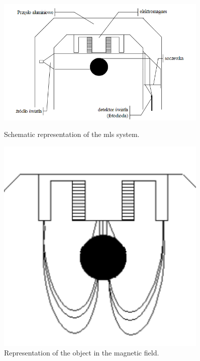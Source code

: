 \begin{figure}[H]
    \centering
    \begin{minipage}{0.45\textwidth}
        \centering
        \includegraphics[width=0.9\textwidth]{./img/maglev_scheme.png}
        \caption{Schematic representation of the \acrshort{mls} system.}
        \label{fig:MLS_schematic}
    \end{minipage}
    \hfill
    \begin{minipage}{0.45\textwidth}
        \centering
        \includegraphics[width=0.9\textwidth]{./img/object_in_magnetic_field.png}
        \caption{Representation of the object in the magnetic field.}
        \label{fig:object_in_magnetic_field}
    \end{minipage}
\end{figure}

